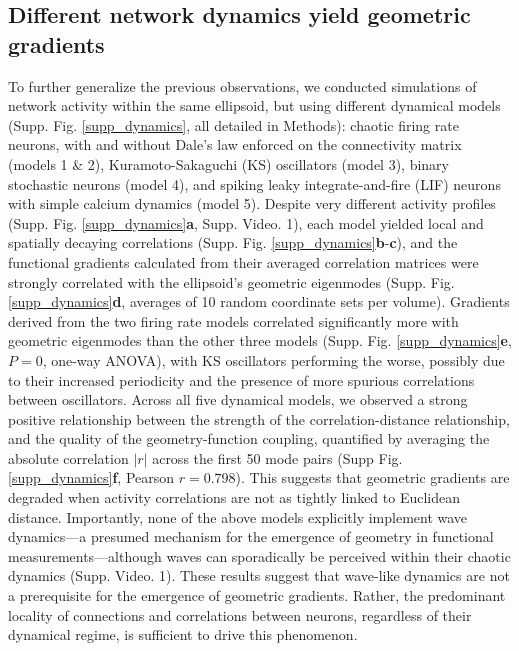 \documentclass{article}
\begin{document}
\subsection*{Different network dynamics yield geometric gradients}

To further generalize the previous observations, we conducted simulations of network activity within the same ellipsoid, but using different dynamical models (Supp. Fig. \ref{supp_dynamics}, all detailed in Methods): chaotic firing rate neurons\cite{sompolinsky1988chaos, rajan2010stimulus}, with and without Dale's law enforced on the connectivity matrix (models 1 \& 2), Kuramoto-Sakaguchi (KS) oscillators\cite{sakaguchi1986soluble} (model 3), binary stochastic neurons (model 4), and spiking leaky integrate-and-fire (LIF) neurons with simple calcium dynamics\cite{izhikevich2007dynamical} (model 5). Despite very different activity profiles (Supp. Fig. \ref{supp_dynamics}\textbf{a}, Supp. Video. 1), each model yielded local and spatially decaying correlations (Supp. Fig. \ref{supp_dynamics}\textbf{b}-\textbf{c}), and the functional gradients calculated from their averaged correlation matrices were strongly correlated with the ellipsoid's geometric eigenmodes (Supp. Fig. \ref{supp_dynamics}\textbf{d}, averages of 10 random coordinate sets per volume). Gradients derived from the two firing rate models correlated significantly more with geometric eigenmodes than the other three models (Supp. Fig. \ref{supp_dynamics}\textbf{e}, $P=0$, one-way ANOVA), with KS oscillators performing the worse, possibly due to their increased periodicity and the presence of more spurious correlations between oscillators. Across all five dynamical models, we observed a strong positive relationship between the strength of the correlation-distance relationship, and the quality of the geometry-function coupling, quantified by averaging the absolute correlation $|r|$ across the first 50 mode pairs (Supp Fig. \ref{supp_dynamics}\textbf{f}, Pearson $r=0.798$). This suggests that geometric gradients are degraded when activity correlations are not as tightly linked to Euclidean distance. Importantly, none of the above models explicitly implement wave dynamics---a presumed mechanism for the emergence of geometry in functional measurements\cite{pang2023geometric}---although waves can sporadically be perceived within their chaotic dynamics (Supp. Video. 1). These results suggest that wave-like dynamics are not a prerequisite for the emergence of geometric gradients. Rather, the predominant locality of connections and correlations between neurons, regardless of their dynamical regime, is sufficient to drive this phenomenon.
\end{document}
